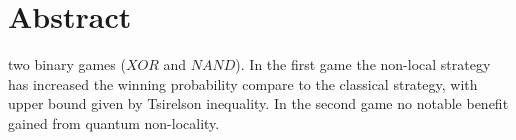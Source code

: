 
\chapter*{Abstract} 
 two binary games ($XOR$ and $NAND$). In the first game the non-local strategy has increased the winning probability  compare to the classical strategy, with upper bound given by Tsirelson inequality\citep*{Cirel'son1980}. In the second game no notable benefit  gained from quantum non-locality.




%
%
%





